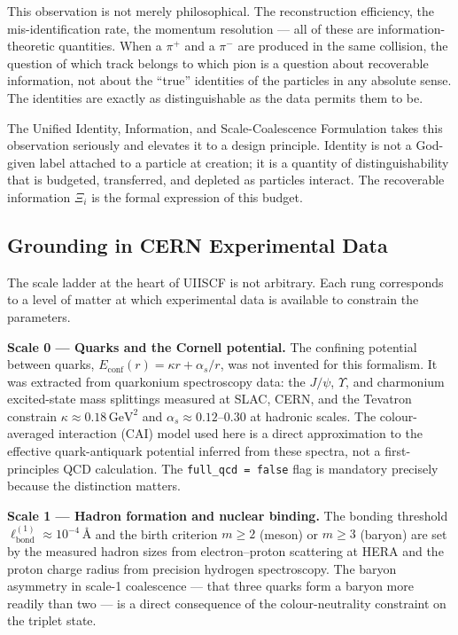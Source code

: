 \documentclass[11pt,a4paper]{article}
\newcommand{\Rec}{\Xi}
\newcommand{\ang}{\,\text{\AA}}
\newcommand{\lbond}{\ell_{\mathrm{bond}}}
\begin{document}
This observation is not merely philosophical.  The reconstruction efficiency,
the mis-identification rate, the momentum resolution --- all of these are
information-theoretic quantities.  When a $\pi^+$ and a $\pi^-$ are produced
in the same collision, the question of which track belongs to which pion is a
question about recoverable information, not about the ``true'' identities of
the particles in any absolute sense.  The identities are exactly as
distinguishable as the data permits them to be.

The Unified Identity, Information, and Scale-Coalescence Formulation takes
this observation seriously and elevates it to a design principle.  Identity
is not a God-given label attached to a particle at creation; it is a quantity
of distinguishability that is budgeted, transferred, and depleted as
particles interact.  The recoverable information $\Rec_i$ is the
formal expression of this budget.

\subsection{Grounding in CERN Experimental Data}

The scale ladder at the heart of UIISCF is not arbitrary.  Each rung
corresponds to a level of matter at which experimental data is available to
constrain the parameters.

\textbf{Scale 0 --- Quarks and the Cornell potential.}
The confining potential between quarks,
$E_{\mathrm{conf}}(r) = \kappa r + \alpha_s / r$, was not invented for this
formalism.  It was extracted from quarkonium spectroscopy data: the $J/\psi$,
$\Upsilon$, and charmonium excited-state mass splittings measured at SLAC,
CERN, and the Tevatron constrain $\kappa \approx 0.18\,\mathrm{GeV}^2$ and
$\alpha_s \approx 0.12$--$0.30$ at hadronic scales.  The colour-averaged
interaction (CAI) model used here is a direct approximation to the effective
quark-antiquark potential inferred from these spectra, not a first-principles
QCD calculation.  The \texttt{full\_qcd = false} flag is mandatory precisely
because the distinction matters.

\textbf{Scale 1 --- Hadron formation and nuclear binding.}
The bonding threshold $\lbond^{(1)} \approx 10^{-4}\ang$ and the birth
criterion $m \geq 2$ (meson) or $m \geq 3$ (baryon) are set by the measured
hadron sizes from electron--proton scattering at HERA and the proton charge
radius from precision hydrogen spectroscopy.  The baryon asymmetry in
scale-1 coalescence --- that three quarks form a baryon more readily than two
--- is a direct consequence of the colour-neutrality constraint on the
triplet state.
\end{document}
